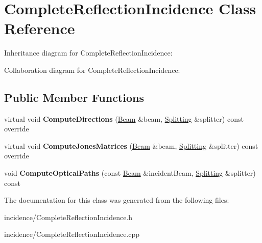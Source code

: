 \hypertarget{class_complete_reflection_incidence}{}\section{Complete\+Reflection\+Incidence Class Reference}
\label{class_complete_reflection_incidence}


Inheritance diagram for Complete\+Reflection\+Incidence\+:


Collaboration diagram for Complete\+Reflection\+Incidence\+:
\subsection*{Public Member Functions}
\begin{DoxyCompactItemize}
\item 
\mbox{\label{class_complete_reflection_incidence_a3364068e607c73d4a215c3ccd9a5e854}} 
virtual void {\bfseries Compute\+Directions} (\mbox{\hyperlink{class_beam}{Beam}} \&beam, \mbox{\hyperlink{class_splitting}{Splitting}} \&splitter) const override
\item 
\mbox{\label{class_complete_reflection_incidence_a8e719e4c8dd8ced7fcf8070f5117fb96}} 
virtual void {\bfseries Compute\+Jones\+Matrices} (\mbox{\hyperlink{class_beam}{Beam}} \&beam, \mbox{\hyperlink{class_splitting}{Splitting}} \&splitter) const override
\item 
\mbox{\label{class_complete_reflection_incidence_a36f51c084d4aefecdb224ac0b791a552}} 
void {\bfseries Compute\+Optical\+Paths} (const \mbox{\hyperlink{class_beam}{Beam}} \&incident\+Beam, \mbox{\hyperlink{class_splitting}{Splitting}} \&splitter) const
\end{DoxyCompactItemize}


The documentation for this class was generated from the following files\+:\begin{DoxyCompactItemize}
\item 
incidence/Complete\+Reflection\+Incidence.\+h\item 
incidence/Complete\+Reflection\+Incidence.\+cpp\end{DoxyCompactItemize}
